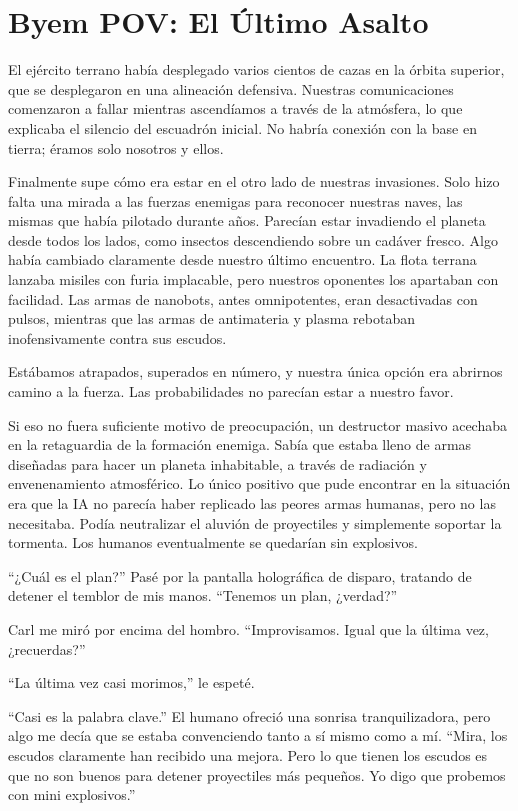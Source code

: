 \chapter{Byem POV: El Último Asalto}

El ejército terrano había desplegado varios cientos de cazas en la órbita superior, que se desplegaron en una alineación defensiva. Nuestras comunicaciones comenzaron a fallar mientras ascendíamos a través de la atmósfera, lo que explicaba el silencio del escuadrón inicial. No habría conexión con la base en tierra; éramos solo nosotros y ellos.

Finalmente supe cómo era estar en el otro lado de nuestras invasiones. Solo hizo falta una mirada a las fuerzas enemigas para reconocer nuestras naves, las mismas que había pilotado durante años. Parecían estar invadiendo el planeta desde todos los lados, como insectos descendiendo sobre un cadáver fresco. Algo había cambiado claramente desde nuestro último encuentro. La flota terrana lanzaba misiles con furia implacable, pero nuestros oponentes los apartaban con facilidad. Las armas de nanobots, antes omnipotentes, eran desactivadas con pulsos, mientras que las armas de antimateria y plasma rebotaban inofensivamente contra sus escudos.

Estábamos atrapados, superados en número, y nuestra única opción era abrirnos camino a la fuerza. Las probabilidades no parecían estar a nuestro favor.

Si eso no fuera suficiente motivo de preocupación, un destructor masivo acechaba en la retaguardia de la formación enemiga. Sabía que estaba lleno de armas diseñadas para hacer un planeta inhabitable, a través de radiación y envenenamiento atmosférico. Lo único positivo que pude encontrar en la situación era que la IA no parecía haber replicado las peores armas humanas, pero no las necesitaba. Podía neutralizar el aluvión de proyectiles y simplemente soportar la tormenta. Los humanos eventualmente se quedarían sin explosivos.

“¿Cuál es el plan?” Pasé por la pantalla holográfica de disparo, tratando de detener el temblor de mis manos. “Tenemos un plan, ¿verdad?”

Carl me miró por encima del hombro. “Improvisamos. Igual que la última vez, ¿recuerdas?”

“La última vez casi morimos,” le espeté.

“Casi es la palabra clave.” El humano ofreció una sonrisa tranquilizadora, pero algo me decía que se estaba convenciendo tanto a sí mismo como a mí. “Mira, los escudos claramente han recibido una mejora. Pero lo que tienen los escudos es que no son buenos para detener proyectiles más pequeños. Yo digo que probemos con mini explosivos.”

